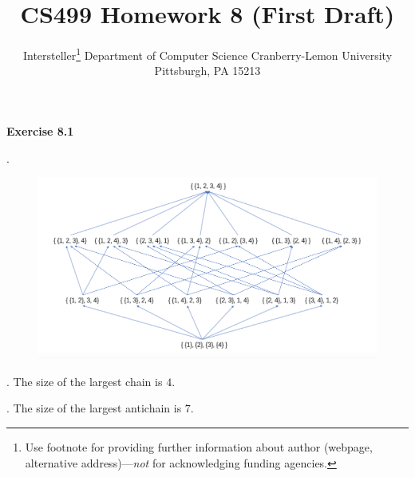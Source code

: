 \documentclass{article} %
\title{CS499 Homework 8 (First Draft)}
\author{
	Intersteller\thanks{ Use footnote for providing further information
		about author (webpage, alternative address)---\emph{not} for acknowledging
		funding agencies.}
	Department of Computer Science
	Cranberry-Lemon University
	Pittsburgh, PA 15213
}
\begin{document}
	\maketitle
	\textbf{Exercise 8.1}\par
	.\par
  	\begin{figure}[H]
  	\centering
  	\includegraphics[scale=0.5]{8_1.png}
  	\caption{}
  	\label{}
  	\end{figure}
	. The size of the largest chain is $4$.\par
	 . The size of the largest antichain is $7$.\par 
	
\end{document}
